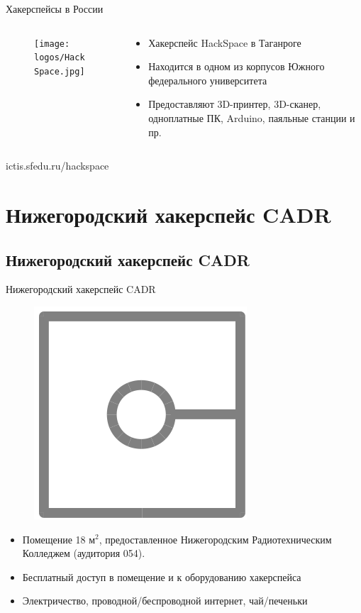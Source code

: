 \documentclass[presentation]{beamer}
\begin{document}
\begin{frame}[label=sec-1-3-6]{Хакерспейсы в России}
  \begin{columns}
    \begin{column}{0.3\textwidth}
      \begin{figure}[htb]
        \texttt{[image: logos/HackSpace.jpg]}
      \end{figure}
    \end{column}
    \begin{column}{0.7\textwidth}
      \begin{itemize}
      \item Хакерспейс HackSpace в Таганроге
      \item Находится в одном из корпусов Южного федерального
        университета
      \item Предоставляют 3D-принтер, 3D-сканер, одноплатные ПК,
        Arduino, паяльные станции и пр.
      \end{itemize}
    \end{column}
  \end{columns}
  \centering
  \vspace{5em}
  ictis.sfedu.ru/hackspace
\end{frame}

\section{Нижегородский хакерспейс CADR}

\label{sec-2}
\subsection{Нижегородский хакерспейс CADR}

\label{sec-2-1}
\begin{frame}[label=sec-2-1-1]{Нижегородский хакерспейс CADR}
  \begin{figure}[htb]
    \includegraphics[width=.3\linewidth]{cadr-logo}
  \end{figure}

  \begin{itemize}
  \item Помещение 18 м$^{\text{2}}$, предоставленное Нижегородским
    Радиотехническим Колледжем (аудитория 054).
  \item Бесплатный доступ в помещение и к оборудованию хакерспейса
  \item Электричество, проводной/беспроводной интернет, чай/печеньки
  \end{itemize}
\end{frame}
\end{document}
